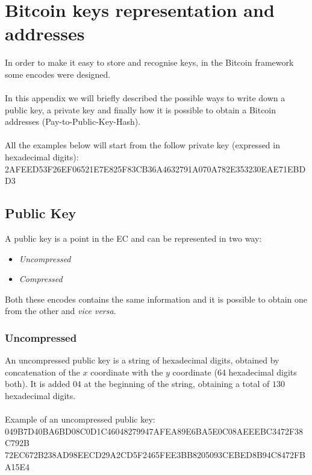 
\chapter{Bitcoin keys representation and addresses}%

\label{AppendixA} %


In order to make it easy to store and recognise keys, in the Bitcoin framework some encodes were designed.
\\ \\
In this appendix we will briefly described the possible ways to write down a public key, a private key and finally how it is possible to obtain a Bitcoin addresses (Pay-to-Public-Key-Hash).
\\ \\
All the examples below will start from the follow private key (expressed in hexadecimal digits): \\
2AFEED53F26EF06521E7E825F83CB36A4632791A070A782E353230EAE71EBDD3


\section{Public Key}
A public key is a point in the EC and can be represented in two way:
\begin{itemize}
	\item \textit{Uncompressed}
	\item \textit{Compressed}
\end{itemize}
 Both these encodes contains the same information and it is possible to obtain one from the other and \textit{vice versa}. 

\subsection{Uncompressed}
An uncompressed public key is a string of hexadecimal digits, obtained by concatenation of the $x$ coordinate with the $y$ coordinate (64 hexadecimal digits both). It is added $04$ at the beginning of the string, obtaining a total of $130$ hexadecimal digits. \\ \\
Example of an uncompressed public key: \\
049B7D40BA6BD08C0D1C46048279947AFEA89E6BA5E0C08AEEEBC3472F38C792B
72EC672B238AD98EECD29A2CD5F2465FEE3BB8205093CEBED8B94C8472FBA15E4


